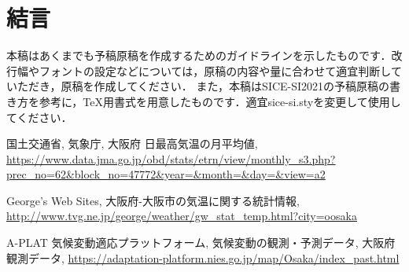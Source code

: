 \documentclass[a4j,fleqn,dvipdfmx,uplatex]{jsarticle}
\begin{document}
\section{結言}
本稿はあくまでも予稿原稿を作成するためのガイドラインを示したものです．改行幅やフォントの設定などについては，原稿の内容や量に合わせて適宜判断していただき，原稿を作成してください．
また，本稿はSICE-SI2021の予稿原稿の書き方\cite{SI2021}を参考に，\TeX 用書式を用意したものです．適宜sice-si.styを変更して使用してください．


\begin{thebibliography}{99}
国土交通省, 気象庁, 大阪府 日最高気温の月平均値, 
\url{https://www.data.jma.go.jp/obd/stats/etrn/view/monthly_s3.php?prec_no=62&block_no=47772&year=&month=&day=&view=a2}\vspace{2mm}

George's Web Sites, 大阪府-大阪市の気温に関する統計情報, 
\url{http://www.tvg.ne.jp/george/weather/gw_stat_temp.html?city=oosaka}\vspace{2mm}

A-PLAT 気候変動適応プラットフォーム, 気候変動の観測・予測データ, 大阪府観測データ, 
\url{https://adaptation-platform.nies.go.jp/map/Osaka/index_past.html}\vspace{2mm}
\end{thebibliography}
%
%
%
\end{document}
